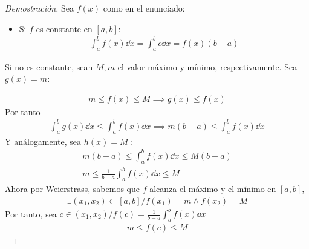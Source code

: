 \documentclass{article}
\begin{document}
\begin{proof}[Demostración]
    Sea $f(x)$ como en el enunciado:
    \begin{itemize}
        \item Si $f$ es constante en $[a,b]$:
        \begin{equation}
            \begin{split}
                \int _{a}^b f(x) \dd{x} = \int _{a}^b c \dd{x} = f(x)(b-a)
            \end{split}
        \end{equation}
    \end{itemize}
    \item Si no es constante, sean $M,m$ el valor máximo y mínimo, respectivamente. Sea $g(x) = m$:
    \item \begin{equation}
        \begin{split}
            m \leq f(x) \leq M \implies g(x) \leq f(x)
        \end{split}
    \end{equation}
    Por tanto
    \begin{equation}
        \begin{split}
            \int _{a}^b g(x) \dd{x} \leq \int _{a}^b f(x) \dd{x} \implies m(b-a) \leq \int _{a}^b f(x) \dd{x}
        \end{split}
    \end{equation}
    Y análogamente, sea \(h(x) = M\) :
    \begin{equation}
        \begin{split}
            m(b-a) \leq \int _{a}^b f(x) \dd{x} \leq M(b-a)\\
            m \leq \frac{1}{b-a} \int _{a}^b f(x) \dd{x} \leq M
        \end{split}
    \end{equation}
    Ahora por Weierstrass, sabemos que $f$ alcanza el máximo y el mínimo en $[a,b]$,
    \begin{equation}
        \begin{split}
            \exists (x_{1},x_{2}) \subset [a,b] / f(x_{1})=m \wedge f(x_{2})=M
        \end{split}
    \end{equation}
    Por tanto, sea \(c \in (x_1, x_2) / f(c)=\frac{1}{b-a} \int _{a}^b f(x) \dd{x}\) 
    \begin{equation}
        \begin{split}
            m \leq f(c) \leq M
        \end{split}

\end{equation}
\end{proof}
\end{document}
